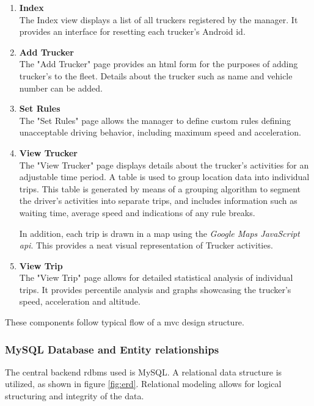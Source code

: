 \begin{enumerate}
\begin{enumerate}
\item \textbf{Index}\\
The Index view displays a list of all truckers registered by the manager.
It provides an interface for resetting each trucker's Android \ac{id}.

\item \textbf{Add Trucker}\\
The "Add Trucker" page provides an \ac{html} form for the purposes of adding trucker's to the fleet.
Details about the trucker such as name and vehicle number can be added.

\item \textbf{Set Rules}\\
The "Set Rules" page allows the manager to define custom rules defining unacceptable driving behavior, including maximum speed and acceleration.

\item \textbf{View Trucker}\\
The "View Trucker" page displays details about the trucker's activities for an adjustable time period.
A table is used to group location data into individual trips.
This table is generated by means of a grouping algorithm to segment the driver's activities into separate trips, and includes information such as waiting time, average speed and indications of any rule breaks.

In addition, each trip is drawn in a map using the \textit{Google Maps JavaScript \ac{api}}.
This provides a neat visual representation of Trucker activities.

\item \textbf{View Trip}\\
The "View Trip" page allows for detailed statistical analysis of individual trips.
It provides percentile analysis and graphs showcasing the trucker's speed, acceleration and altitude.
\end{enumerate}
\end{enumerate}
These components follow typical flow of a \ac{mvc} design structure.

\subsubsection{MySQL Database and Entity relationships}
The central backend \ac{rdbms} used is MySQL.
A relational data structure is utilized, as shown in figure \ref{fig:erd}.
Relational modeling allows for logical structuring and integrity of the data.

